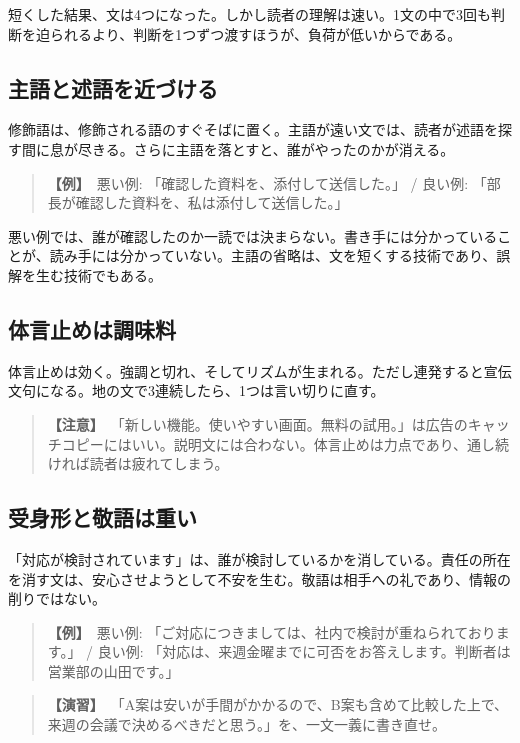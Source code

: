 \documentclass{article}
\begin{document}
短くした結果、文は4つになった。しかし読者の理解は速い。1文の中で3回も判断を迫られるより、判断を1つずつ渡すほうが、負荷が低いからである。

\subsection{主語と述語を近づける}

修飾語は、修飾される語のすぐそばに置く。主語が遠い文では、読者が述語を探す間に息が尽きる。さらに主語を落とすと、誰がやったのかが消える。

\begin{quote}
\textbf{【例】}\ 悪い例: 「確認した資料を、添付して送信した。」 / 良い例: 「部長が確認した資料を、私は添付して送信した。」
\end{quote}

悪い例では、誰が確認したのか一読では決まらない。書き手には分かっていることが、読み手には分かっていない。主語の省略は、文を短くする技術であり、誤解を生む技術でもある。

\subsection{体言止めは調味料}

体言止めは効く。強調と切れ、そしてリズムが生まれる。ただし連発すると宣伝文句になる。地の文で3連続したら、1つは言い切りに直す。

\begin{quote}
\textbf{【注意】}\ 「新しい機能。使いやすい画面。無料の試用。」は広告のキャッチコピーにはいい。説明文には合わない。体言止めは力点であり、通し続ければ読者は疲れてしまう。
\end{quote}

\subsection{受身形と敬語は重い}

「対応が検討されています」は、誰が検討しているかを消している。責任の所在を消す文は、安心させようとして不安を生む。敬語は相手への礼であり、情報の削りではない。

\begin{quote}
\textbf{【例】}\ 悪い例: 「ご対応につきましては、社内で検討が重ねられております。」 / 良い例: 「対応は、来週金曜までに可否をお答えします。判断者は営業部の山田です。」
\end{quote}

\begin{quote}
\textbf{【演習】}\ 「A案は安いが手間がかかるので、B案も含めて比較した上で、来週の会議で決めるべきだと思う。」を、一文一義に書き直せ。
\end{quote}
\end{document}
